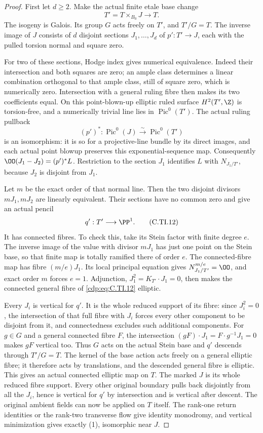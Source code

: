 \begin{proof}
First let \(d\ge2\). Make the actual
finite etale base change
\[
 T'=T\times_{B_0}J\longrightarrow T.
 \tag{C.TI.10}\label{cdp:eq:C.TI.10}
\]
The isogeny is Galois. Its group \(G\)
acts freely on \(T'\), and \(T'/G=T\).
The inverse image of \(J\) consists of
\(d\) disjoint sections \(J_1,\ldots,J_d\)
of \(p':T'\to J\), each with the pulled
torsion normal and square zero.

For two of these sections, Hodge index
gives numerical equivalence. Indeed their
intersection and both squares are zero;
an ample class determines a linear
combination orthogonal to that ample
class, still of square zero, which is
numerically zero. Intersection with a
general ruling fibre then makes its two
coefficients equal. On this point-blown-up
elliptic ruled surface \(H^2(T',\Z)\) is
torsion-free, and a numerically trivial
line lies in \(\operatorname{Pic}^0(T')\).
The actual ruling pullback
\[
        (p')^*:\operatorname{Pic}^0(J)
                       \xrightarrow{\sim}\operatorname{Pic}^0(T')
 \tag{C.TI.11}\label{cdp:eq:C.TI.11}
\]
is an isomorphism: it is so for a
projective-line bundle by its direct
images, and each actual point blowup
preserves this exponential-sequence map.
Consequently
\(\OO(J_1-J_2)=(p')^*L\). Restriction to
the section \(J_1\) identifies \(L\)
with \(N_{J_1/T'}\), because \(J_2\)
is disjoint from \(J_1\).

Let \(m\) be the exact order of that
normal line. Then the two disjoint
divisors \(mJ_1,mJ_2\) are linearly
equivalent. Their sections have no
common zero and give an actual pencil
\[
                  q':T'\longrightarrow\PP^1.
 \tag{C.TI.12}\label{cdp:eq:C.TI.12}
\]
It has connected fibres. To check this,
take its Stein factor with finite degree
\(e\). The inverse image of the value
with divisor \(mJ_1\) has just one
point on the Stein base, so that finite
map is totally ramified there of
order \(e\). The connected-fibre map
has fibre \((m/e)J_1\). Its local
principal equation gives
\(N_{J_1/T'}^{m/e}=\OO\), and exact
order \(m\) forces \(e=1\).
Adjunction, \(J_1^2=K_{T'}\cdot J_1=0\),
then makes the connected general fibre
of \eqref{cdp:eq:C.TI.12} elliptic.

Every \(J_i\) is vertical for \(q'\).
It is the whole reduced support of
its fibre: since \(J_i^2=0\), the
intersection of that full fibre
with \(J_i\) forces every other
component to be disjoint from it,
and connectedness excludes such
additional components.
For \(g\in G\) and a general connected
fibre \(F\), the intersection
\((gF)\cdot J_1=F\cdot g^{-1}J_1=0\)
makes \(gF\) vertical too. Thus \(G\)
acts on the actual Stein base and
\(q'\) descends through \(T'/G=T\).
The kernel of the base action acts
freely on a general elliptic fibre;
it therefore acts by translations,
and the descended general fibre
is elliptic. This gives an actual
connected elliptic map on \(T\).
The marked \(J\) is its whole reduced
fibre support. Every other original
boundary pulls back disjointly from
all the \(J_i\), hence is vertical
for \(q'\) by intersection and is
vertical after descent. The original
ambient fields can now be applied
on \(T\) itself. The rank-one return
identities or the rank-two transverse
flow give identity monodromy, and
vertical minimization gives exactly
(1), isomorphic near \(J\).


\end{proof}
